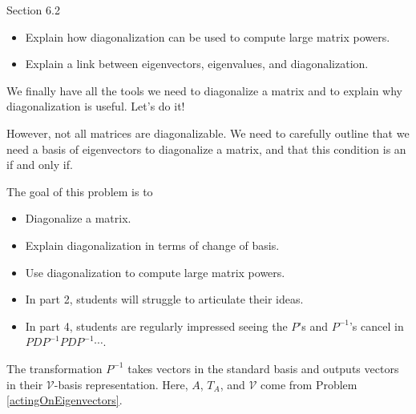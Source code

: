 \documentclass{problemset}
\begin{document}
\begin{lesson}

	Section 6.2

	\begin{itemize}
		\item Explain how diagonalization can be used to compute large matrix powers.
		\item Explain a link between eigenvectors, eigenvalues, and diagonalization.

	\end{itemize}

	We finally have all the tools we need to diagonalize a matrix and to explain why diagonalization is useful.
	Let's do it!

	However, not all matrices are diagonalizable. We need to carefully outline that we need a
	basis of eigenvectors to diagonalize a matrix, and that this condition is an if and only if.

\end{lesson}
	\question
	\begin{annotation}
		\begin{goals}

			The goal of this problem is to
			\begin{itemize}
				\item Diagonalize a matrix.
				\item Explain diagonalization in terms of change of basis.
				\item Use diagonalization to compute large matrix powers.
			\end{itemize}
		\end{goals}

		\begin{notes}
			\begin{itemize}
				\item In part 2, students will struggle to articulate their ideas.
				\item In part 4, students are regularly impressed seeing the $P$'s and
					$P^{-1}$'s cancel in $PDP^{-1}PDP^{-1}\cdots$.
			\end{itemize}
		\end{notes}
	\end{annotation}
	The transformation $P^{-1}$ takes vectors in the standard basis and outputs
	vectors in their $\mathcal V$-basis representation. Here, $A$, $T_A$, and $\mathcal V$
	come from Problem \ref{actingOnEigenvectors}.
\end{document}
